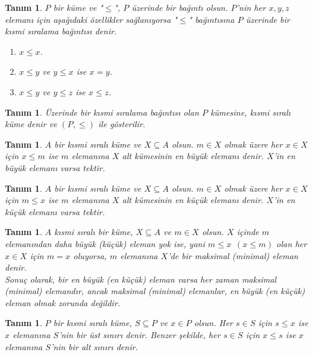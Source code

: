 \documentclass[a4paper,12pt]{article}
\numberwithin{equation}{section}
\theoremstyle{italik}
\newtheorem{tanim}[teorem]{Tanım}
\begin{document}
\begin{tanim}
     $ P $ bir küme ve "$\leq$", $ P $ üzerinde bir bağıntı olsun. $ P $'nin her $ x, y, z$ elemanı 
     için aşağıdaki özellikler sağlanıyorsa "$ \leq $" bağıntısına $P$ üzerinde bir 
     \textit{kısmi sıralama bağıntısı} denir. 
     \begin{enumerate}
          \itemsep 0em
          \item $ x \leq x $.
          \item $ x \leq y $ ve $ y \leq x $ ise $ x = y $. 
          \item $ x \leq y $ ve $ y \leq z $ ise $ x \leq z $.
     \end{enumerate}
\end{tanim}

\begin{tanim}
     Üzerinde bir kısmi sıralama bağıntısı olan $ P $ kümesine, 
     \textit{kısmi sıralı küme} denir ve $ (P,\leq) $ ile gösterilir. 
\end{tanim}


\begin{tanim}
     $ A $ bir kısmi sıralı küme ve $ X \subseteq A $ olsun. 
     $ m \in X $ olmak üzere her $ x \in X $ için $ x \leq m $ ise $ m $ elemanına 
     $ X $ alt kümesinin \textit{en büyük elemanı} denir. $ X $'in en büyük elemanı varsa tektir. 
\end{tanim}

\begin{tanim}
     $ A $ bir kısmi sıralı küme ve $ X \subseteq A $ olsun. 
     $ m \in X $ olmak üzere her $ x \in X $ için $ m \leq x $ ise $ m $ elemanına 
     $ X $ alt kümesinin \textit{en küçük elemanı} denir. 
     $ X $'in en küçük elemanı varsa tektir. 
\end{tanim}
\begin{tanim}
     $ A $ kısmi sıralı bir küme, $ X \subseteq A $ ve $ m \in X $ olsun. 
     $ X $ içinde $ m $ elemanından daha büyük (küçük) eleman yok ise, 
     yani $ m \leq x \ \  (x \leq m) $ olan her $ x \in X $ için $ m = x $ 
     oluyorsa, $ m $ elemanına $ X $'de bir \textit{maksimal (minimal) eleman} denir.   \\
     \indent Sonuç olarak, bir en büyük (en küçük) eleman varsa her zaman maksimal (minimal) elemandır, 
     ancak maksimal (minimal) elemanlar, en büyük (en küçük) eleman olmak zorunda değildir.
\end{tanim}

\begin{tanim}
     $ P $ bir kısmi sıralı küme, $ S \subseteq P $ ve $ x \in P $ olsun. Her $ s \in S $ için 
     $ s \leq x $ ise $ x $ elemanına $ S $'nin bir \textit{üst sınırı} denir. 
     Benzer şekilde, her $ s \in S $ için $ x \leq s $ ise $ x $ elemanına $ S $'nin 
     bir \textit{alt sınırı} denir. 
\end{tanim}
\end{document}
